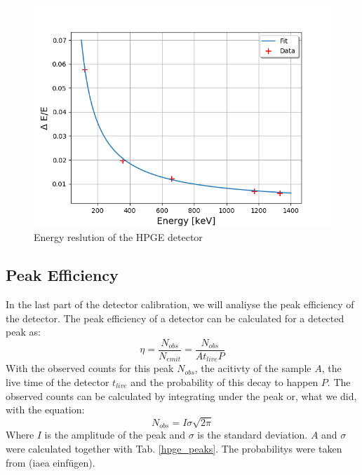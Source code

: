 \begin{figure}[h]
  \includegraphics[width=\linewidth]{../Plots/hpge_resolution.png}
  \caption{Energy reslution of the HPGE detector}
  \label{hpge_res}
\end{figure}

\clearpage

\subsection{Peak Efficiency}
In the last part of the detector calibration, we will analiyse the peak efficiency of the detector.
The peak efficiency of a detector can be calculated for a detected peak as:
\begin{equation}
\eta = \frac{N_{obs}}{N_{emit}} = \frac{N_{obs}}{At_{live}P}
\end {equation}
With the observed counts for this peak $N_{obs}$, the acitivty of the sample $A$, the live time of the detector $t_{live}$ and the probability of this decay to happen $P$.
The observed counts can be calculated by integrating under the peak or, what we did, with the equation:
\begin{equation}
N_{obs} = I \sigma \sqrt{2\pi}
\label{gauss_area}
\end {equation}
Where $I$ is the amplitude of the peak and $\sigma$ is the standard deviation.
$A$ and $\sigma$ were calculated together with Tab. \ref{hpge_peaks}.
The probabilitys were taken from (iaea einfügen).

